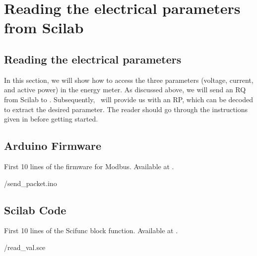 

\section{Reading the electrical parameters from Scilab}
\subsection{Reading the electrical parameters}
In this section, we will show how to access the three parameters (voltage, current, and active power) in the energy meter. As discussed above, we will send an RQ from Scilab to \arduino. Subsequently, \arduino\ will provide us with an RP, which can be decoded to extract the desired parameter. The reader should go through the instructions given in  before getting started. 

\subsection{Arduino Firmware}
\label{sec:firmware-modbus}
\begin{ardcode}
  {First 10 lines of the firmware for Modbus.  Available at
    .}
  \label{ard:firmware-modbus}
  
  {\LocMODardcode/send_packet.ino}
\end{ardcode}

\subsection{Scilab Code}
\label{sec:modbus-scilab-code}

\begin{scicode}
  {First 10 lines of the Scifunc block function.  Available at
    .}
  \label{sci:current-modbus}
  
  {\LocMODscicode/read_val.sce}
\end{scicode}

